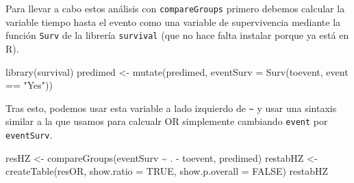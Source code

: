 \documentclass[
]{book}
\newenvironment{Shaded}{\begin{snugshade}}{\end{snugshade}}
\newcommand{\AttributeTok}[1]{\textcolor[rgb]{0.77,0.63,0.00}{#1}}
\newcommand{\ConstantTok}[1]{\textcolor[rgb]{0.00,0.00,0.00}{#1}}
\newcommand{\FunctionTok}[1]{\textcolor[rgb]{0.00,0.00,0.00}{#1}}
\newcommand{\NormalTok}[1]{#1}
\newcommand{\OtherTok}[1]{\textcolor[rgb]{0.56,0.35,0.01}{#1}}
\newcommand{\SpecialCharTok}[1]{\textcolor[rgb]{0.00,0.00,0.00}{#1}}
\newcommand{\StringTok}[1]{\textcolor[rgb]{0.31,0.60,0.02}{#1}}
\begin{document}
Para llevar a cabo estos análisis con \texttt{compareGroups} primero debemos calcular la variable tiempo hasta el evento como una variable de supervivencia mediante la función \texttt{Surv} de la librería \texttt{survival} (que no hace falta instalar porque ya está en R).

\begin{Shaded}
\begin{Highlighting}[]
\FunctionTok{library}\NormalTok{(survival)}
\NormalTok{predimed }\OtherTok{\textless{}{-}} \FunctionTok{mutate}\NormalTok{(predimed, }
                   \AttributeTok{eventSurv =} \FunctionTok{Surv}\NormalTok{(toevent, event }\SpecialCharTok{==} \StringTok{"Yes"}\NormalTok{))}
\end{Highlighting}
\end{Shaded}

Tras esto, podemos usar esta variable a lado izquierdo de \texttt{\textasciitilde{}} y usar una sintaxis similar a la que usamos para calcualr OR simplemente cambiando \texttt{event} por \texttt{eventSurv}.

\begin{Shaded}
\begin{Highlighting}[]
\NormalTok{resHZ }\OtherTok{\textless{}{-}} \FunctionTok{compareGroups}\NormalTok{(eventSurv }\SpecialCharTok{\textasciitilde{}}\NormalTok{ . }\SpecialCharTok{{-}}\NormalTok{ toevent, predimed)}
\NormalTok{restabHZ }\OtherTok{\textless{}{-}} \FunctionTok{createTable}\NormalTok{(resOR, }\AttributeTok{show.ratio =} \ConstantTok{TRUE}\NormalTok{,}
                        \AttributeTok{show.p.overall =} \ConstantTok{FALSE}\NormalTok{)}
\NormalTok{restabHZ}
\end{Highlighting}
\end{Shaded}
\end{document}
